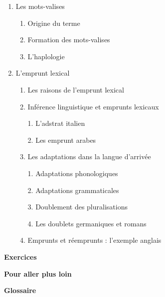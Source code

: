 \begin{keybox}
\begin{enumerate}[label=\arabic*.]
\begin{enumerate}[label=\textcircled{\scriptsize\arabic*}]
\item La prothèse
\item La paragoge
\item Le phonème éphelcystique
\item L’épenthèse
\item L’agglutination
\item La crase
\end{enumerate}
\item Les mots-valises
\begin{enumerate}[label=\textcircled{\scriptsize\arabic*}]
\item Origine du terme
\item Formation des mots-valises
\item L’haplologie
\end{enumerate}
\item L’emprunt lexical
\begin{enumerate}[label=\textcircled{\scriptsize\arabic*}]
\item Les raisons de l’emprunt lexical
\item Inférence linguistique et emprunts lexicaux\par
1. L’adstrat italien\par 2. Les emprunt arabes
\item Les adaptations dans la langue d’arrivée\par
1. Adaptations phonologiques\par 2. Adaptations grammaticales\par
3. Doublement des pluralisations\par 4. Les doublets germaniques et romans
\item Emprunts et réemprunts : l’exemple anglais
\end{enumerate}
\end{enumerate}
\textbf{Exercices}\par
\textbf{Pour aller plus loin}\par
\textbf{Glossaire}
\end{keybox}


